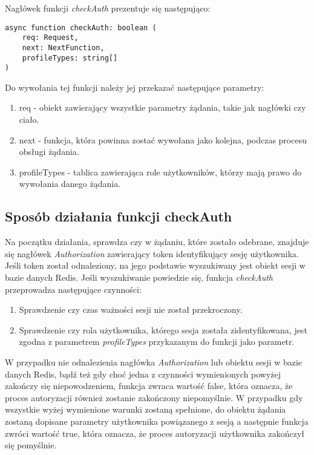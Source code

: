 \documentclass[a4paper,12pt,twoside,openany]{report}
\begin{document}
Nagłówek funkcji \textit{checkAuth} prezentuje się następująco:
\begin{verbatim}
async function checkAuth: boolean (
    req: Request,
    next: NextFunction,                        
    profileTypes: string[]
)
\end{verbatim}
Do wywołania tej funkcji należy jej przekazać następujące parametry:
\begin{enumerate}
	
	\item req - obiekt zawierający wszystkie parametry żądania, takie jak nagłówki czy ciało.
	
	\item next - funkcja, która powinna zostać wywołana jako kolejna, podczas procesu obsługi żądania.
	
	\item profileTypes - tablica zawierająca role użytkowników, którzy mają prawo do wywołania danego żądania.
\end{enumerate}

\subsection{Sposób działania funkcji checkAuth}
Na początku działania, sprawdza czy w żądaniu, które zostało odebrane, znajduje się nagłówek \textit{Authorization} zawierający token identyfikujący sesję użytkownika. Jeśli token został odnaleziony, na jego podstawie wyszukiwany jest obiekt sesji w bazie danych Redis. Jeśli wyszukiwanie powiedzie się, funkcja \textit{checkAuth} przeprowadza następujące czynności:
\begin{enumerate}	
	\item Sprawdzenie czy czas ważności sesji nie został przekroczony.
	
	\item Sprawdzenie czy rola użytkownika, którego sesja została zidentyfikowana, jest zgodna z parametrem \textit{profileTypes} przykazanym do funkcji jako parametr.
\end{enumerate}
W przypadku nie odnalezienia nagłówka \textit{Authorization} lub obiektu sesji w bazie danych Redis, bądź też gdy choć jedna z czynności wymienionych powyżej zakończy się niepowodzeniem, funkcja zwraca wartość false, która oznacza, że proces autoryzacji również zostanie zakończony niepomyślnie. W przypadku gdy wszystkie wyżej wymienione warunki zostaną spełnione, do obiektu żądania zostaną dopisane parametry użytkownika powiązanego z sesją a następnie funkcja zwróci wartość true, która oznacza, że proces autoryzacji użytkownika zakończył się pomyślnie.
\end{document}
